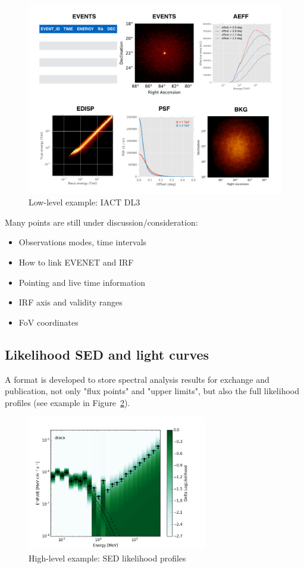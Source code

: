 \begin{figure}[tb]
  \centerline{\includegraphics[width=\textwidth]{figures/iact-dl3}}
  \caption{Low-level example: IACT DL3}
  \label{fig:iact-dl3}
\end{figure}

Many points are still under discussion/consideration:

\begin{itemize}
\item{}Observations modes, time intervals
\item{}How to link EVENET and IRF
\item{}Pointing and live time information
\item{}IRF axis and validity ranges
\item{}FoV coordinates
\end{itemize}

\subsection{Likelihood SED and light curves}

A format is developed to store spectral analysis results for exchange and publication, not only "flux points" and "upper limits", but also the full likelihood profiles (see example in Figure~\ref{fig:sed}).

\begin{figure}[tb]
  \centerline{\includegraphics[width=0.7\textwidth]{figures/llsed_hights}}
  \caption{High-level example: SED likelihood profiles}
  \label{fig:sed}
\end{figure}

